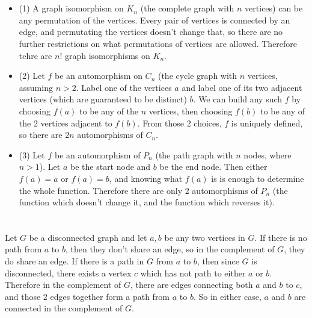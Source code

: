 \documentclass[12pt]{article}
\begin{document}
\section{}
\noindent{}\bigskip\par
\begin{itemize}
    \item (1) A graph isomorphism on $K_n$ (the complete graph with $n$ vertices) can be any permutation of the vertices. Every pair of vertices is connected by an edge, and permutating the vertices doesn't change that, so there are no further restrictions on what permutations of vertices are allowed. Therefore tehre are $n!$ graph isomorphisms on $K_n$.
    \item (2) Let $f$ be an automorphism on $C_n$ (the cycle graph with $n$ vertices, assuming $n>2$. Label one of the vertices $a$ and label one of its two adjacent vertices (which are guaranteed to be distinct) $b$. We can build any such $f$ by choosing $f(a)$ to be any of the $n$ vertices, then choosing $f(b)$ to be any of the 2 vertices adjacent to $f(b)$. From those 2 choices, $f$ is uniquely defined, so there are $2n$ automorphisms of $C_n$.
    \item (3) Let $f$ be an automorphism of $P_n$ (the path graph with $n$ nodes, where $n>1$). Let $a$ be the start node and $b$ be the end node. Then either $f(a)=a$ or $f(a)=b$, and knowing what $f(a)$ is is enough to determine the whole function. Therefore there are only 2 automorphisms of $P_n$ (the function which doesn't change it, and the function which reverses it).
\end{itemize}

\section{}
\noindent{}\bigskip\par
Let $G$ be a disconnected graph and let $a,b$ be any two vertices in $G$. If there is no path from $a$ to $b$, then they don't share an edge, so in the complement of $G$, they do share an edge. If there is a path in $G$ from $a$ to $b$, then since $G$ is disconnected, there exists a vertex $c$ which has not path to either $a$ or $b$. Therefore in the complement of $G$, there are edges connecting both $a$ and $b$ to $c$, and those 2 edges together form a path from $a$ to $b$. So in either case, $a$ and $b$ are connected in the complement of $G$.
\end{document}
